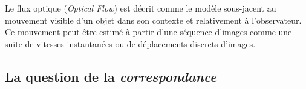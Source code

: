 \documentclass[a4paper,11pt]{report}
\begin{document}
	Le flux optique (\textit{Optical Flow}) est décrit comme le modèle sous-jacent au mouvement visible d'un objet dans son contexte et relativement à l'observateur. Ce mouvement peut être estimé à partir d'une séquence d'images comme une suite de vitesses instantanées ou de déplacements discrets d'images.\\ 
	
	

\subsection{La question de la \textit{correspondance}}
\end{document}
